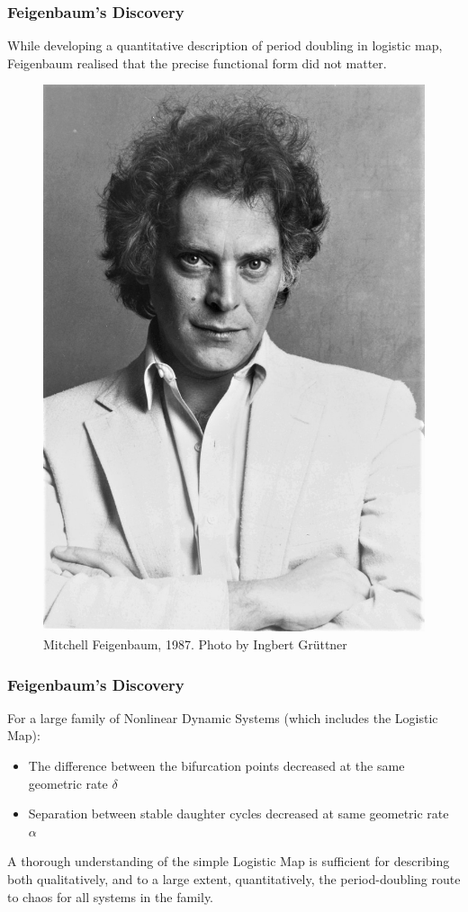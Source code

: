 \documentclass[
	11pt, %
	aspectratio=169, %
]{beamer}
\begin{document}
\begin{frame}
	\frametitle{Feigenbaum's Discovery}
	While developing a quantitative description of period doubling in logistic map, Feigenbaum realised that the precise functional form did not matter. \pause

    \begin{figure}
		\includegraphics[width=0.15\linewidth]{feigenbaum.jpg}
		\caption{Mitchell Feigenbaum, 1987. Photo by Ingbert Grüttner}
	\end{figure}

\end{frame}


\begin{frame}
    \frametitle{Feigenbaum's Discovery}
    For a large family of Nonlinear Dynamic Systems (which includes the Logistic Map):
    \begin{itemize}
        \item The difference between the bifurcation points decreased at the same geometric rate $\delta$ \pause
        \item Separation between stable daughter cycles decreased at same geometric rate $\alpha$ \pause
    \end{itemize}
    A thorough understanding of the simple Logistic Map is sufficient for describing both qualitatively, and to a large extent, quantitatively, the period-doubling route to chaos for all systems in the family.

\end{frame}   
\end{document}
